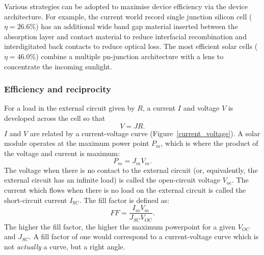 Various strategies can be adopted to maximise device efficiency via the device architecture. For example, the current world record single junction silicon cell ($\eta=26.6\%$) has an additional wide band gap material inserted between the absorption layer and contact material to reduce interfacial recombination and interdigitated back contacts to reduce optical loss.\autocite{Yoshikawa2017} The most efficient solar cells ($\eta=46.0\%$) combine a multiple pn-junction architecture with a lens to concentrate the incoming sunlight.

\subsubsection{Efficiency and reciprocity}
For a load in the external circuit given by $R$, a current $I$ and voltage $V$ is developed across the cell so that
$$ V = JR. $$
$I$ and $V$ are related by a current-voltage curve (Figure\ \ref{current_voltage}).
A solar module operates at the maximum power point $P_m$, which is where the product of the voltage and current is maximum:
$$ P_m  = J_m V_m. $$
The voltage when there is no contact to the external circuit (or, equivalently, the external circuit has an infinite load) is called the open-circuit voltage $V_{\text{oc}}$. The current which flows when there is no load on the external circuit is called the short-circuit current $I_{\text{SC}}$.
The fill factor is defined as:
$$ FF = \frac{I_mV_m}{J_{SC} V_{OC}}.$$
The higher the fill factor, the higher the maximum powerpoint for a given $V_{OC}$ and $J_{SC}$.\autocite{Nelson2003} A fill factor of one would correspond to a current-voltage curve which is not \textit{actually} a curve, but a right angle.

